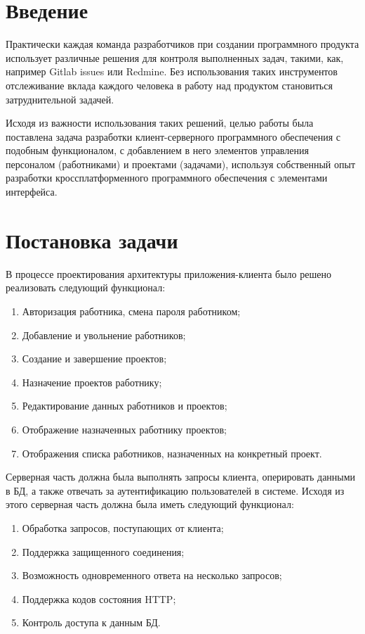\section*{Введение}
Практически каждая команда разработчиков при создании программного продукта использует различные решения для контроля выполненных задач,
такими, как, например Gitlab issues или Redmine.
Без использования таких инструментов отслеживание вклада каждого человека в работу над продуктом становиться затруднительной задачей.

Исходя из важности использования таких решений, целью работы была поставлена задача разработки клиент-серверного программного обеспечения
с подобным функционалом, с добавлением в него элементов управления персоналом (работниками) и проектами (задачами),
используя собственный опыт разработки кроссплатформенного программного обеспечения с элементами интерфейса.


\clearpage
\section{Постановка задачи}
В процессе проектирования архитектуры приложения-клиента было решено реализовать следующий функционал:
\begin{enumerate}
    \item Авторизация работника, смена пароля работником;
    \item Добавление и увольнение работников;
    \item Создание и завершение проектов;
    \item Назначение проектов работнику;
    \item Редактирование данных работников и проектов;
    \item Отображение назначенных работнику проектов;
    \item Отображения списка работников, назначенных на конкретный проект.
\end{enumerate}

Серверная часть должна была выполнять запросы клиента, оперировать данными в БД, а также отвечать за аутентификацию пользователей в системе.
Исходя из этого серверная часть должна была иметь следующий функционал:
\begin{enumerate}
    \item Обработка запросов, поступающих от клиента;
    \item Поддержка защищенного соединения;
    \item Возможность одновременного ответа на несколько запросов;
    \item Поддержка кодов состояния HTTP;
    \item Контроль доступа к данным БД.
\end{enumerate}


